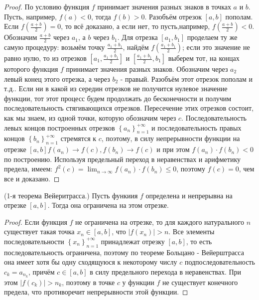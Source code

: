 \begin{proof}
    По условию функция $f$ принимает значения разных знаков в точках $a$ и $b$. Пусть, например, $f(a)<0$, тогда $f(b)>0$. Разобъём отрезок $[a, b]$ пополам. Если $f\left(\frac{a+b}{2}\right)=0$, то всё доказано, а если нет, то пусть,например, $f\left(\frac{a+b}{2}\right)<0$. Обозначим $\frac{a+b}{2}$ через $a_1$, а $b$ через $b_1$. Для отрезка $\left[a_1, b_1\right]$ проделаем ту же самую процедуру: возьмём точку $\frac{a_1+b_1}{2}$, найдём $f\left(\frac{a_1+b_1}{2}\right)$; если это значение не равно нулю, то из отрезков $\left[a_1, \frac{a_1+b_1}{2}\right]$ и $\left[\frac{a_1+b_1}{2}, b_1\right]$ выберем тот, на концах которого функция $f$ принимает значения разных знаков. Обозначим через $a_2$ левый конец этого отрезка, а через $b_2$ - правый. Разобъём этот отрезок пополам и т.д.. Если ни в какой из середин отрезков не получится нулевое значение функции, тот этот процесс будем продолжать до бесконечности и получим последовательность стягивающихся отрезков. Пересечение этих отрезков состоит, как мы знаем, из одной точки, которую обозначим через $c$. Последовательность левых концов построенных отрезков $\left\{a_n\right\}_{n=1}^{+\infty}$ и последовательность правых концов $\left\{b_n\right\}_{n=1}^{+\infty}$ стремятся к $c$, поэтому, в силу непрерывности функции на отрезке $[a, b] f\left(a_n\right) \rightarrow f(c), f\left(b_n\right) \rightarrow f(c)$ и при этом $f\left(a_n\right) \cdot f\left(b_n\right)<0$ по построению. Используя предельный переход в неравенствах и арифметику предела, имеем: $f^2(c)=\lim _{n \rightarrow \infty} f\left(a_n\right) \cdot f\left(b_n\right) \leq 0$, поэтому $f(c)=0$, чем все и доказано.
\end{proof}

\begin{theorem}
    (1-я теорема Вейеритрасса.) Пусть функиия $f$ определена и непрерывна на отрезке $[a, b]$. Тогда она ограничена на этом отрезке.
\end{theorem}

\begin{proof}
    Если функция $f$ не ограничена на отрезке, то для каждого натурального $n$ существует такая точка $x_n \in[a, b]$, что $\left|f\left(x_n\right)\right|>n$. Все элементы последовательности $\left\{x_n\right\}_{n=1}^{+\infty}$ принадлежат отрезку $[a, b]$, то есть последовательность ограничена, поэтому по теореме Больцано - Вейерштрасса она имеет хотя бы одну сходящуюся к некоторому числу $c$ подпоследовательность $c_k=a_{n_k}$, причём $c \in[a, b]$ в силу предельного перехода в неравенствах. При этом $\left|f\left(c_k\right)\right|>n_k$, поэтому в точке $c$ у функции $f$ не существует конечного предела, что противоречит непрерывности этой функции.
\end{proof}

